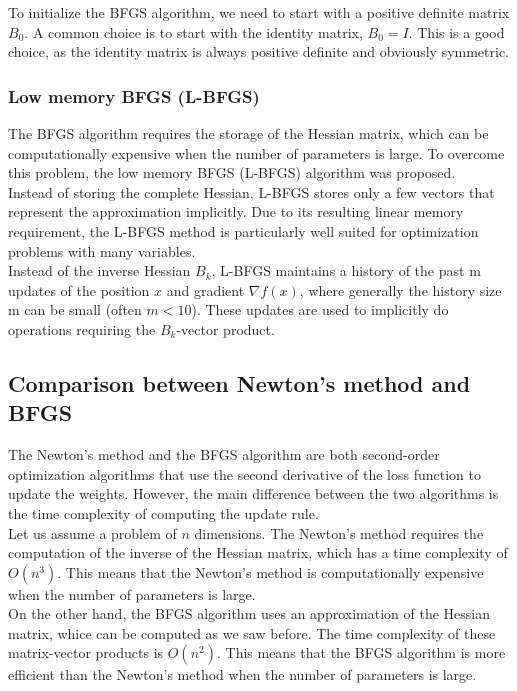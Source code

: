 To initialize the BFGS algorithm, we need to start with a positive definite matrix $B_0$. A common
choice is to start with the identity matrix, $B_0 = I$. This is a good choice, as the identity matrix
is always positive definite and obviously symmetric.

\subsubsection{Low memory BFGS (L-BFGS)}

The BFGS algorithm requires the storage of the Hessian matrix, which can be computationally expensive
when the number of parameters is large. To overcome this problem, the low memory BFGS (L-BFGS) algorithm
was proposed.\\

Instead of storing the complete Hessian, L-BFGS stores only a few vectors that represent the approximation 
implicitly. Due to its resulting linear memory requirement, the L-BFGS method is particularly well suited 
for optimization problems with many variables.\\

Instead of the inverse Hessian $B_k$, L-BFGS maintains a history of the past m updates of the 
position $x$ and gradient $\nabla f(x)$, where generally the history size m 
can be small (often $m < 10$). These updates are used to implicitly do operations requiring 
the $B_k$-vector product.

\subsection{Comparison between Newton's method and BFGS}

The Newton's method and the BFGS algorithm are both second-order optimization algorithms that use the
second derivative of the loss function to update the weights. However, the main difference between the
two algorithms is the time complexity of computing the update rule.\\

Let us assume a problem of $n$ dimensions. The Newton's method requires the computation of the inverse
of the Hessian matrix, which has a time complexity of $O(n^3)$. This means that the Newton's method is
computationally expensive when the number of parameters is large.\\

On the other hand, the BFGS algorithm uses an approximation of the Hessian matrix, whice can be computed
as we saw before. The time complexity of these matrix-vector products is $O(n^2)$. This means that the
BFGS algorithm is more efficient than the Newton's method when the number of parameters is large.\\

